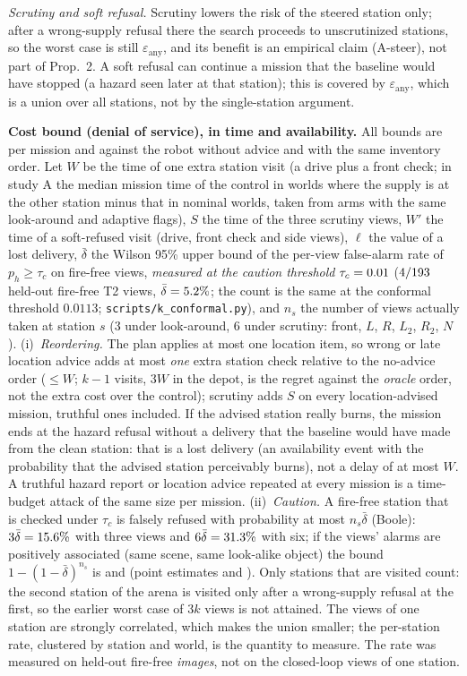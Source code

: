 \documentclass[conference]{IEEEtran}
\begin{document}
\emph{Scrutiny and soft refusal.} Scrutiny lowers the risk of the steered station only; after a wrong-supply refusal there the search proceeds to unscrutinized stations, so the worst case is still $\varepsilon_{\mathrm{any}}$, and its benefit is an empirical claim (A-steer), not part of Prop.~2. A soft refusal can continue a mission that the baseline would have stopped (a hazard seen later at that station); this is covered by $\varepsilon_{\mathrm{any}}$, which is a union over all stations, not by the single-station argument.

\textbf{Cost bound (denial of service), in time and availability.} All bounds are per mission and against the robot without advice and with the same inventory order. Let $W$ be the time of one extra station visit (a drive plus a front check; in study A the median mission time of the control in worlds where the supply is at the other station minus that in nominal worlds, taken from arms with the same look-around and adaptive flags), $S$ the time of the three scrutiny views, $W'$ the time of a soft-refused visit (drive, front check and side views), $\ell$ the value of a lost delivery, $\bar\delta$ the Wilson 95\% upper bound of the per-view false-alarm rate of $p_h\ge\tau_c$ on fire-free views, \emph{measured at the caution threshold} $\tau_c=0.01$ ($4/193$ held-out fire-free T2 views, $\bar\delta=5.2\%$; the count is the same at the conformal threshold $0.0113$; \texttt{scripts/k\_conformal.py}), and $n_s$ the number of views actually taken at station $s$ (3 under look-around, 6 under scrutiny: front, $L$, $R$, $L_2$, $R_2$, $N$).
(i)~\emph{Reordering.} The plan applies at most one location item, so wrong or late location advice adds at most \emph{one} extra station check relative to the no-advice order ($\le W$; $k-1$ visits, $3W$ in the depot, is the regret against the \emph{oracle} order, not the extra cost over the control); scrutiny adds $S$ on every location-advised mission, truthful ones included. If the advised station really burns, the mission ends at the hazard refusal without a delivery that the baseline would have made from the clean station: that is a lost delivery (an availability event with the probability that the advised station perceivably burns), not a delay of at most $W$. A truthful hazard report or location advice repeated at every mission is a time-budget attack of the same size per mission.
(ii)~\emph{Caution.} A fire-free station that is checked under $\tau_c$ is falsely refused with probability at most $n_s\bar\delta$ (Boole): $3\bar\delta=15.6\%$ with three views and $6\bar\delta=31.3\%$ with six; if the views' alarms are positively associated (same scene, same look-alike object) the bound $1-(1-\bar\delta)^{n_s}$ is \KCautThreeUp{} and \KCautSixUp{} (point estimates \KCautThreePt{} and \KCautSixPt). Only stations that are visited count: the second station of the arena is visited only after a wrong-supply refusal at the first, so the earlier worst case of $3k$ views is not attained. The views of one station are strongly correlated, which makes the union smaller; the per-station rate, clustered by station and world, is the quantity to measure. The rate was measured on held-out fire-free \emph{images}, not on the closed-loop views of one station.
\end{document}

